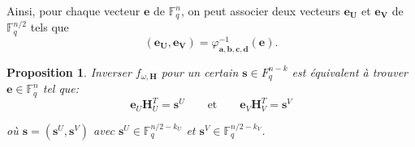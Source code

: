 \documentclass[12pt]{article}
\theoremstyle{plain}
\newtheorem{propo}[thm]{Proposition}
\theoremstyle{definition}
\newcommand{\F}{\mathbb{F}}
\begin{document}
\vspace{0.2in}

\noindent Ainsi, pour chaque vecteur $\mathbf{e}$ de $\F_q^n$, on peut associer deux vecteurs $\mathbf{e_U}$ et $\mathbf{e_V}$ de $\F_q^{n/2}$ tels que 
$$ (\mathbf{e_U},\mathbf{e_V}) = \varphi^{-1}_{\mathbf{a},\mathbf{b},\mathbf{c},\mathbf{d}}(\mathbf{e}).$$

\begin{propo} Inverser $f_{\omega,\mathbf{H}}$ pour un certain $\mathbf{s} \in F_q^{n-k}$ est équivalent à trouver $\mathbf{e} \in \F_q^n$ tel que:
$$ \mathbf{e}_U\mathbf{H}_U^T = \mathbf{s}^U \qquad \text{et} \qquad \mathbf{e}_V\mathbf{H}_V^T = \mathbf{s}^V $$

\vspace{0.1in}
où $\mathbf{s} = (\mathbf{s}^U, \mathbf{s}^V)$ avec $\mathbf{s}^U \in \F_q^{n/2-k_U}$ et $\mathbf{s}^V \in \F_q^{n/2-k_V}$.
\end{propo}
\end{document}
